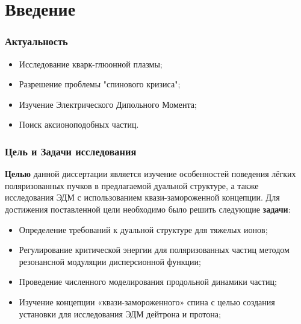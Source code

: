 \section{Введение}
\begin{frame}
 \frametitle{Актуальность}
 	\begin{itemize}
 		\item Исследование кварк-глюонной плазмы;
 		\item Разрешение проблемы "спинового кризиса";
 		\item Изучение Электрического Дипольного Момента;
 		\item Поиск аксионоподобных частиц.
 	\end{itemize}


\end{frame}
\begin{frame}
	\frametitle{Цель и Задачи исследования}
	\textbf{Целью} данной диссертации является изучение особенностей поведения лёгких поляризованных пучков в предлагаемой дуальной структуре, а также исследования ЭДМ с использованием квази-замороженной концепции.\newline \newline
	Для достижения поставленной цели необходимо было решить следующие \textbf{задачи}:
	\begin{itemize}
		\item Определение требований к дуальной структуре для тяжелых ионов;
		\item Регулирование критической энергии для поляризованных частиц методом резонансной модуляции дисперсионной функции;
		\item Проведение численного моделирования продольной динамики частиц;
		\item Изучение концепции «квази-замороженного» спина с целью создания установки для исследования ЭДМ дейтрона и протона;
	\end{itemize}
\end{frame}
